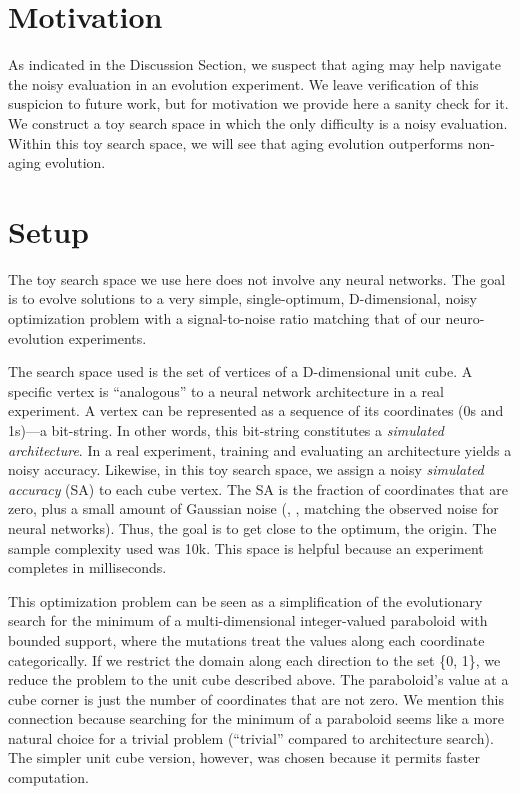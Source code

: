 \documentclass[letterpaper]{article} \usepackage{aaai19}  \usepackage{times}  \usepackage{helvet}  \usepackage{courier}  \usepackage{graphicx}  \frenchspacing
\begin{document}
\section{Motivation}


As indicated in the Discussion Section, we suspect that aging may help navigate the noisy evaluation in an evolution experiment. We leave verification of this suspicion to future work, but for motivation we provide here a sanity check for it. We construct a toy search space in which the only difficulty is a noisy evaluation. Within this toy search space, we will see that aging evolution outperforms non-aging evolution.


\section{Setup}


The toy search space we use here does not involve any neural networks. The goal is to evolve solutions to a very simple, single-optimum, D-dimensional, noisy optimization problem with a signal-to-noise ratio matching that of our neuro-evolution experiments. 

The search space used is the set of vertices of a D-dimensional unit cube. A specific vertex is ``analogous'' to a neural network architecture in a real experiment. A vertex can be represented as a sequence of its coordinates (0s and 1s)---a bit-string. In other words, this bit-string constitutes a \textit{simulated architecture}. In a real experiment, training and evaluating an architecture yields a noisy accuracy. Likewise, in this toy search space, we assign a noisy \textit{simulated accuracy} (SA) to each cube vertex. The SA is the fraction of coordinates that are zero, plus a small amount of Gaussian noise (, , matching the observed noise for neural networks). Thus, the goal is to get close to the optimum, the origin. The sample complexity used was 10k. This space is helpful because an experiment completes in milliseconds.

This optimization problem can be seen as a simplification of the evolutionary search for the minimum of a multi-dimensional integer-valued paraboloid with bounded support, where the mutations treat the values along each coordinate categorically. If we restrict the domain along each direction to the set \{0, 1\}, we reduce the problem to the unit cube described above. The paraboloid's value at a cube corner is just the number of coordinates that are not zero. We mention this connection because searching for the minimum of a paraboloid seems like a more natural choice for a trivial problem (``trivial'' compared to architecture search). The simpler unit cube version, however, was chosen because it permits faster computation.
\end{document}
